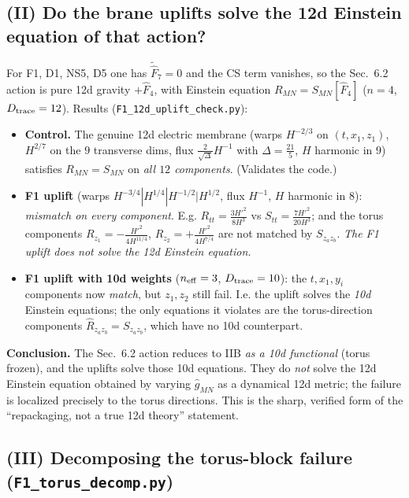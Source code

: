 \subsection*{(II) Do the brane uplifts solve the 12d Einstein equation of that action?}

For F1, D1, NS5, D5 one has $\tilde{\hat F}_7=0$ and the CS term vanishes, so the Sec.~6.2
action is pure 12d gravity $+\hat F_4$, with Einstein equation $R_{MN}=S_{MN}[\hat F_4]$
($n=4$, $D_{\rm trace}=12$). Results (\texttt{F1\_12d\_uplift\_check.py}):

\begin{itemize}
\item[(B)] \textbf{Control.} The genuine 12d electric membrane (warps $H^{-2/3}$ on $(t,x_1,z_1)$,
$H^{2/7}$ on the $9$ transverse dims, flux $\tfrac{2}{\sqrt\Delta}H^{-1}$ with $\Delta=\tfrac{21}{5}$,
$H$ harmonic in $9$) satisfies $R_{MN}=S_{MN}$ on \emph{all $12$ components}. (Validates the code.)
\item[(A)] \textbf{F1 uplift} (warps $H^{-3/4}|H^{1/4}|H^{-1/2}|H^{1/2}$, flux $H^{-1}$, $H$ harmonic
in $8$): \emph{mismatch on every component}. E.g. $R_{tt}=\tfrac{3H'^2}{8H^3}$ vs
$S_{tt}=\tfrac{7H'^2}{20H^3}$; and the torus components $R_{z_1}=-\tfrac{H'^2}{4H^{11/4}}$,
$R_{z_2}=+\tfrac{H'^2}{4H^{7/4}}$ are not matched by $S_{z_az_b}$. \emph{The F1 uplift does not
solve the 12d Einstein equation.}
\item[(C)] \textbf{F1 uplift with 10d weights} ($n_{\rm eff}=3$, $D_{\rm trace}=10$): the
$t,x_1,y_i$ components now \emph{match}, but $z_1,z_2$ still fail. I.e. the uplift solves the
\emph{10d} Einstein equations; the only equations it violates are the torus-direction components
$\hat R_{z_az_b}=S_{z_az_b}$, which have no 10d counterpart.
\end{itemize}

\textbf{Conclusion.} The Sec.~6.2 action reduces to IIB \emph{as a 10d functional} (torus frozen),
and the uplifts solve those 10d equations. They do \emph{not} solve the 12d Einstein equation
obtained by varying $\hat g_{MN}$ as a dynamical 12d metric; the failure is localized precisely to
the torus directions. This is the sharp, verified form of the ``repackaging, not a true 12d theory''
statement.

\subsection*{(III) Decomposing the torus-block failure (\texttt{F1\_torus\_decomp.py})}

